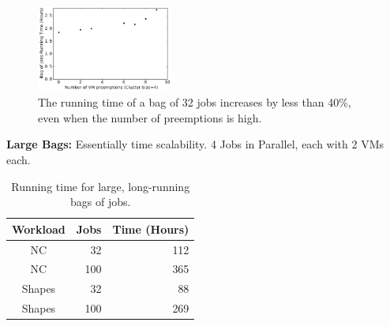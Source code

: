 \begin{figure}[t]
  \centering 
  \includegraphics[width=0.4\textwidth]{../graphs/confin-fails-vs-time.pdf}
  \caption{The running time of a bag of 32 jobs increases by less than 40\%, even when the number of preemptions is high.}
  \label{fig:fails-time}
\end{figure}

\noindent \textbf{Large Bags:} Essentially time scalability. 4 Jobs in Parallel, each with 2 VMs each.  

\begin{table}
  \begin{tabular}{|c|r|r|}
    \hline
    Workload & Jobs & Time (Hours) \\
    \hline
    NC & 32  & 112 \\
    NC & 100  & 365 \\
    \hline
    Shapes & 32 & 88 \\
    Shapes & 100 & 269 \\  
    \hline
  \end{tabular}
  \caption{Running time for large, long-running bags of jobs.}
  \label{tab:100-jobs}
\end{table}






